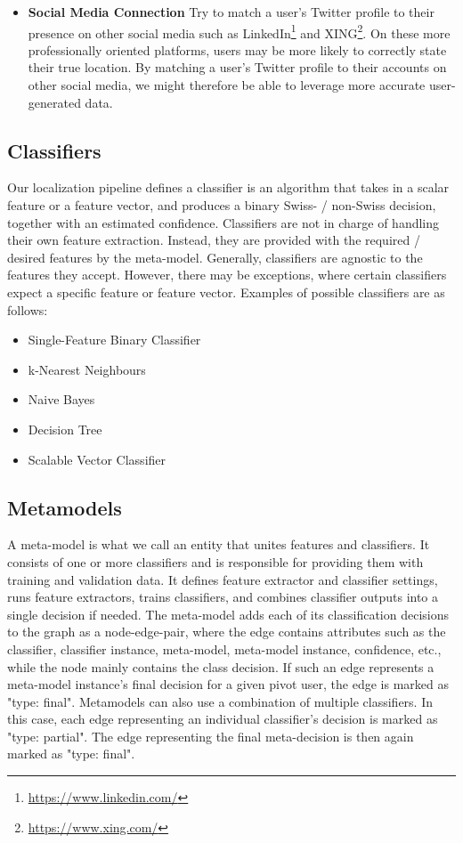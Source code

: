 \documentclass[10pt,a4paper]{article}
\begin{document}
\begin{itemize}
\item \textbf{Social Media Connection} Try to match a user's Twitter profile to their presence on other social media such as LinkedIn\footnote{\href{https://www.linkedin.com/}{https://www.linkedin.com/}} and XING\footnote{\href{https://www.xing.com/}{https://www.xing.com/}}. On these more professionally oriented platforms, users may be more likely to correctly state their true location. By matching a user's Twitter profile to their accounts on other social media, we might therefore be able to leverage more accurate user-generated data. 
\end{itemize}

\subsection{Classifiers}
Our localization pipeline defines a classifier is an algorithm that takes in a scalar feature or a feature vector, and produces  a binary Swiss- / non-Swiss decision, together with an estimated confidence. Classifiers are not in charge of handling their own feature extraction. Instead, they are provided with the required / desired features by the meta-model. Generally, classifiers are agnostic to the features they accept. However, there may be exceptions, where certain classifiers expect a specific feature or feature vector. Examples of possible classifiers are as follows:
\begin{itemize}
\item Single-Feature Binary Classifier
\item k-Nearest Neighbours
\item Naive Bayes
\item Decision Tree
\item Scalable Vector Classifier
\end{itemize}

\subsection{Metamodels}
A meta-model is what we call an entity that unites features and classifiers. It consists of one or more classifiers and is responsible for providing them with training and validation data. It defines feature extractor and classifier settings, runs feature extractors, trains classifiers, and combines classifier outputs into a single decision if needed. The meta-model adds each of its classification decisions to the graph as a node-edge-pair, where the edge contains attributes such as the classifier, classifier instance, meta-model, meta-model instance, confidence, etc., while the node mainly contains the class decision. If such an edge represents a meta-model instance's final decision for a given pivot user, the edge is marked as "type: final". Metamodels can also use a combination of multiple classifiers. In this case, each edge representing an individual classifier's decision is marked as "type: partial". The edge representing the final meta-decision is then again marked as "type: final".
\end{document}
